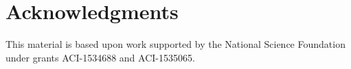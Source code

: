 \documentclass[final,twocolumn]{elsarticle}
\begin{document}
\section*{Acknowledgments}
\ifmeasure
\addvspace{10pt}
\fi

This material is based upon work supported by the National Science Foundation under grants ACI-1534688 and ACI-1535065.

\ifmeasure
\footnotesize
\baselineskip 9pt
\setlength{\bibsep}{0pt plus 0.3ex}
\fi


\fi
\end{document}
